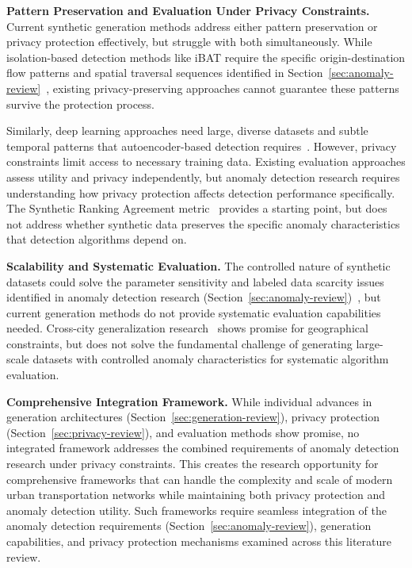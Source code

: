 \documentclass[runningheads]{llncs}
\begin{document}
\textbf{Pattern Preservation and Evaluation Under Privacy Constraints.} Current synthetic generation methods address either pattern preservation or privacy protection effectively, but struggle with both simultaneously. While isolation-based detection methods like iBAT require the specific origin-destination flow patterns and spatial traversal sequences identified in Section~\ref{sec:anomaly-review}~\cite{zhangIBATDetectingAnomalous2011}, existing privacy-preserving approaches cannot guarantee these patterns survive the protection process.

Similarly, deep learning approaches need large, diverse datasets and subtle temporal patterns that autoencoder-based detection requires~\cite{huangLSTMAutoencodersAttention2021}. However, privacy constraints limit access to necessary training data. Existing evaluation approaches assess utility and privacy independently, but anomaly detection research requires understanding how privacy protection affects detection performance specifically. The Synthetic Ranking Agreement metric~\cite{jordonPATEGANGeneratingSynthetic2019} provides a starting point, but does not address whether synthetic data preserves the specific anomaly characteristics that detection algorithms depend on.

\textbf{Scalability and Systematic Evaluation.} The controlled nature of synthetic datasets could solve the parameter sensitivity and labeled data scarcity issues identified in anomaly detection research (Section~\ref{sec:anomaly-review})~\cite{zhangIBATDetectingAnomalous2011}, but current generation methods do not provide systematic evaluation capabilities needed. Cross-city generalization research~\cite{wangGTGGeneralizableTrajectory2025} shows promise for geographical constraints, but does not solve the fundamental challenge of generating large-scale datasets with controlled anomaly characteristics for systematic algorithm evaluation.

\textbf{Comprehensive Integration Framework.} While individual advances in generation architectures (Section~\ref{sec:generation-review}), privacy protection (Section~\ref{sec:privacy-review}), and evaluation methods show promise, no integrated framework addresses the combined requirements of anomaly detection research under privacy constraints. This creates the research opportunity for comprehensive frameworks that can handle the complexity and scale of modern urban transportation networks while maintaining both privacy protection and anomaly detection utility. Such frameworks require seamless integration of the anomaly detection requirements (Section~\ref{sec:anomaly-review}), generation capabilities, and privacy protection mechanisms examined across this literature review.
\end{document}
